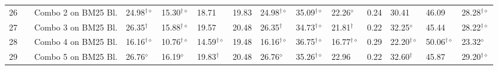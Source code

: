 \begin{table*}
{\begin{tabular}{ccllllllllllll}
26  &  & Combo 2 on BM25 Bl.  & 24.98$^{\dagger\diamond}$  & 15.30$^{\dagger\diamond}$  & 18.71  & 19.83 & 24.98$^{\dagger\diamond}$  & 35.09$^{\dagger\diamond}$  & 22.26$^{\diamond}$  & 0.24  & 30.41  & 46.09  & 28.28$^{\dagger\diamond}$ \tabularnewline
27  &  & Combo 3 on BM25 Bl.  & 26.35$^{\dagger}$  & 15.88$^{\dagger\diamond}$  & 19.57  & 20.48 & 26.35$^{\dagger}$  & 34.73$^{\dagger\diamond}$  & 21.81$^{\dagger}$  & 0.22  & 32.25$^{\diamond}$  & 45.44  & 28.22$^{\dagger\diamond}$\tabularnewline
28  &  & Combo 4 on BM25 Bl.  & 16.16$^{\dagger\diamond}$  & 10.76$^{\dagger\diamond}$  & 14.59$^{\dagger\diamond}$  & 19.48 & 16.16$^{\dagger\diamond}$  & 36.75$^{\dagger\diamond}$  & 16.77$^{\dagger\diamond}$  & 0.29  & 22.20$^{\dagger\diamond}$  & 50.06$^{\dagger\diamond}$  & 23.32$^{\diamond}$\tabularnewline
29  &  & Combo 5 on BM25 Bl.  & 26.76$^{\diamond}$  & 16.19$^{\diamond}$  & 19.83$^{\dagger}$  & 20.48 & 26.76$^{\diamond}$  & 35.26$^{\dagger\diamond}$  & 22.96  & 0.22  & 32.60$^{\dagger}$  & 45.87  & 29.20$^{\dagger\diamond}$\tabularnewline
\bottomrule
\end{tabular}} %
\end{table*}

